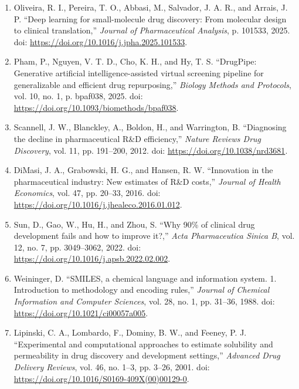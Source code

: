 \documentclass[IB]{TFUOC}%
\begin{document}
\begin{enumerate}
\item \label{ref:oliveira2025} Oliveira, R. I., Pereira, T. O., Abbasi, M., Salvador, J. A. R., and Arrais, J. P.  
``Deep learning for small-molecule drug discovery: From molecular design to clinical translation,''  
\textit{Journal of Pharmaceutical Analysis}, p. 101533, 2025.  
doi: \url{https://doi.org/10.1016/j.jpha.2025.101533}.

\item \label{ref:pham2025} Pham, P., Nguyen, V. T. D., Cho, K. H., and Hy, T. S.  
``DrugPipe: Generative artificial intelligence-assisted virtual screening pipeline for generalizable and efficient drug repurposing,''  
\textit{Biology Methods and Protocols}, vol. 10, no. 1, p. bpaf038, 2025.  
doi: \url{https://doi.org/10.1093/biomethods/bpaf038}.

\item \label{ref:scannell2012} Scannell, J. W., Blanckley, A., Boldon, H., and Warrington, B.  
``Diagnosing the decline in pharmaceutical R\&D efficiency,''  
\textit{Nature Reviews Drug Discovery}, vol. 11, pp. 191--200, 2012.  
doi: \url{https://doi.org/10.1038/nrd3681}.

\item \label{ref:dimasi2016} DiMasi, J. A., Grabowski, H. G., and Hansen, R. W.  
``Innovation in the pharmaceutical industry: New estimates of R\&D costs,''  
\textit{Journal of Health Economics}, vol. 47, pp. 20--33, 2016.  
doi: \url{https://doi.org/10.1016/j.jhealeco.2016.01.012}.

\item \label{ref:sun2022} Sun, D., Gao, W., Hu, H., and Zhou, S.  
``Why 90\% of clinical drug development fails and how to improve it?,''  
\textit{Acta Pharmaceutica Sinica B}, vol. 12, no. 7, pp. 3049--3062, 2022.  
doi: \url{https://doi.org/10.1016/j.apsb.2022.02.002}.

\item \label{ref:weininger1988} Weininger, D.  
``SMILES, a chemical language and information system. 1. Introduction to methodology and encoding rules,''  
\textit{Journal of Chemical Information and Computer Sciences}, vol. 28, no. 1, pp. 31--36, 1988.  
doi: \url{https://doi.org/10.1021/ci00057a005}.

\item \label{ref:lipinski2001} Lipinski, C. A., Lombardo, F., Dominy, B. W., and Feeney, P. J.  
``Experimental and computational approaches to estimate solubility and permeability in drug discovery and development settings,''  
\textit{Advanced Drug Delivery Reviews}, vol. 46, no. 1--3, pp. 3--26, 2001.  
doi: \url{https://doi.org/10.1016/S0169-409X(00)00129-0}.


\end{enumerate}
\end{document}
